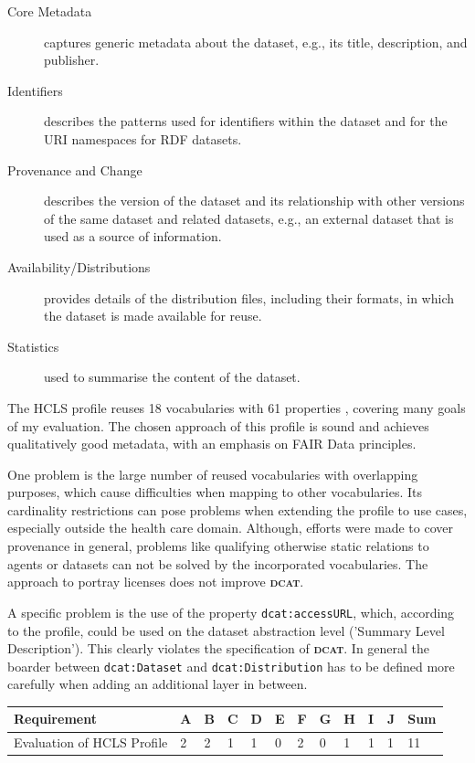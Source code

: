 \documentclass[a4paper,english,twoside,BCOR1.5cm,headsepline,DIV12,appendixprefix,final,12pt]{scrbook}
\newcommand{\dcat}{{\scshape\bfseries dcat}\xspace}
\newcommand{\prop}[1]{{{\texttt{#1}}}}
\begin{document}
\begin{description}
\item[Core Metadata] captures generic metadata about the dataset, e.g., its title, description, and publisher.

\item[Identifiers] describes the patterns used for identifiers within the dataset and for the URI namespaces for RDF datasets.

\item[Provenance and Change] describes the version of the dataset and its relationship with other versions of the same dataset and related datasets, e.g., an external dataset that is used as a source of information.

\item[Availability/Distributions] provides details of the distribution files, including their formats, in which the dataset is made available for reuse.

\item[Statistics] used to summarise the content of the dataset.
\end{description}

The HCLS profile reuses 18 vocabularies with 61 properties \cite{HCLSCP2016}, covering many goals of my evaluation. The chosen approach of this profile is sound and achieves qualitatively good metadata, with an emphasis on FAIR Data principles.

One problem is the large number of reused vocabularies with overlapping purposes, which cause difficulties when mapping to other vocabularies. Its cardinality restrictions can pose problems when extending the profile to use cases, especially outside the health care domain. Although, efforts were made to cover provenance in general, problems like qualifying otherwise static relations to agents or datasets can not be solved by the incorporated vocabularies. The approach to portray licenses does not improve \dcat.

A specific problem is the use of the property \prop{dcat:accessURL}, which, according to the profile, could be used on the dataset abstraction level ('Summary Level Description'). This clearly violates the specification of \dcat. In general the boarder between \prop{dcat:Dataset} and \prop{dcat:Distribution} has to be defined more carefully when adding an additional layer in between.

\begin{table}[!htbp]
    \centering
    \begin{tabular}{|l|l|l|l|l|l|l|l|l|l|l|l|}
        \hline
        Requirement & A & B & C & D & E & F & G & H & I & J & Sum \\
        \hline
        Evaluation of HCLS Profile & 2 & 2 & 1 & 1 & 0 & 2 & 0 & 1 & 1 & 1 & 11 \\
        \hline
    \end{tabular}
    \label{tab:evaldcatap}
\end{table}
\end{document}
